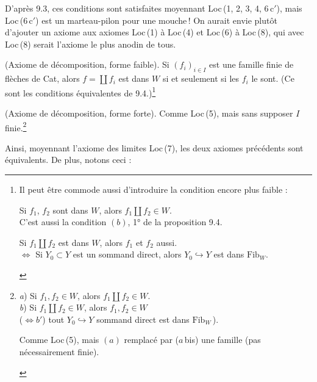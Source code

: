\documentclass[11pt]{article}
\newcommand{\msp}[1]{\marginpar{\footnotesize [#1]}}
\newcommand{\Fib}{\mathrm{Fib}}
\begin{document}
\msp{page 124}

D'après 9.3, ces conditions sont satisfaites moyennant Loc\,(1, 2, 3, 4, 6\,c$'$), mais Loc\,(6\,c$'$) est un marteau-pilon pour une mouche\,! On aurait envie plutôt d'ajouter un axiome aux axiomes Loc\,(1) à Loc\,(4) et Loc\,(6) à Loc\,(8), qui avec Loc\,(8) serait l'axiome le plus anodin de tous.

\begin{description}[labelwidth=5.5em,leftmargin=6.5em,style=sameline]
\item[Loc\,(5)] (Axiome de décomposition, forme faible). Si $(f_i)_{i\in I}$ est une famille finie de flèches de Cat, alors $f=\coprod f_i$ est dans $W$ si et seulement si les $f_i$ le sont. (Ce sont les conditions équivalentes de 9.4.)\footnote[48]{Il peut être commode aussi d'introduire la condition encore plus faible :
\begin{description}[nosep,labelwidth=4.5em,leftmargin=5em,style=sameline]
\item[Loc\,(5\,a)] Si $f_1$, $f_2$ sont dans $W$, alors $f_1\amalg f_2\in W$.\\
C'est aussi la condition $(b)$, 1° de la proposition 9.4.
\item[Loc\,(5\,b)] Si $f_1\amalg f_2$ est dans $W$, alors $f_1$ et $f_2$ aussi.\\
$\iff$ Si $Y_0\subset Y$ est un sommand direct, alors $Y_0\hookrightarrow Y$ est dans $\Fib_W$.
\end{description}}

\item[Loc\,(5\,bis)] (Axiome de décomposition, forme forte). Comme Loc\,(5), mais sans supposer $I$ finie.\footnote[49]{
\begin{description}[nosep,labelwidth=4.5em,leftmargin=5em,style=sameline]
\item[Loc\,(5)] \textit{a}) Si $f_1,f_2\in W$, alors $f_1\amalg f_2\in W$.\\
\textit{b}) Si $f_1\amalg f_2\in W$, alors $f_1,f_2\in W$\\
($\iff b'$) tout $Y_0\hookrightarrow Y$ sommand direct est dans $\Fib_W$\,).
\item[Loc\,(5\,bis)] Comme Loc\,(5), mais $(a)$ remplacé par ($a$\,bis) une famille (pas nécessairement finie).
\end{description}}
\end{description}

Ainsi, moyennant l'axiome des limites Loc\,(7), les deux axiomes précédents sont équivalents. De plus, notons ceci :
\end{document}
